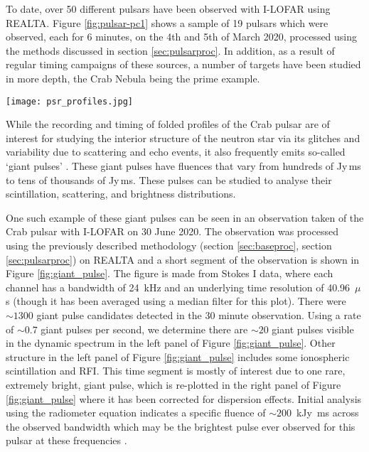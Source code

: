 To date, over 50 different pulsars have been observed with I-LOFAR using REALTA. Figure \ref{fig:pulsar-pc1} shows a sample of 19 pulsars which were observed, each for 6 minutes, on the 4th and 5th of March 2020, processed using the methods discussed in section \ref{sec:pulsarproc}. In addition, as a result of regular timing campaigns of these sources, a number of targets have been studied in more depth, the Crab Nebula being the prime example. 
\begin{figure*}[t]
    \centering
    \texttt{[image: psr\_profiles.jpg]}
    \caption[Sample of 19 pulsars observed with I-LOFAR and REALqTA.]{Sample of 19 pulsars observed with I-LOFAR and REALTA. Each of these observations is 6 minutes in duration and were taken on 4--5 March 2020 using the HBA antennas (\SIrange{110}{190}{\mega \hertz}). The data were processed using the method described in section \ref{sec:pulsarproc} and plotted using \texttt{PSRCHIVE}. The x-axis in each plot is the pulse phase in radians, while the y-axis is flux density in arbitrary units.}
    \label{fig:pulsar-pc1}
\end{figure*}
While the recording and timing of folded profiles of the Crab pulsar are of interest for studying the interior structure of the neutron star via its glitches \citep{Lyne2015} and variability due to scattering and echo events, it also frequently emits so-called `giant pulses' \citep{Meyers2017}. These giant pulses have fluences that vary from hundreds of Jy\,ms to tens of thousands of Jy\,ms. These pulses can be studied to analyse their scintillation, scattering, and brightness distributions.

One such example of these giant pulses can be seen in an observation taken of the Crab pulsar with I-LOFAR on 30 June 2020. The observation was processed using the previously described methodology (section \ref{sec:baseproc}, section \ref{sec:pulsarproc}) on REALTA and a short segment of the observation is shown in Figure \ref{fig:giant_pulse}. The figure is made from Stokes I data, where each channel has a bandwidth of 24~kHz and an underlying time resolution of 40.96~$\mu$s (though it has been averaged using a median filter for this plot). There were $\sim 1300$ giant pulse candidates detected in the 30 minute observation. Using a rate of $\sim 0.7$ giant pulses per second, we determine there are $\sim 20$ giant pulses visible in the dynamic spectrum in the left panel of Figure \ref{fig:giant_pulse}. Other structure in the left panel of Figure \ref{fig:giant_pulse} includes some ionospheric scintillation and RFI. This time segment is mostly of interest due to one rare, extremely bright, giant pulse, which is re-plotted in the right panel of Figure \ref{fig:giant_pulse} where it has been corrected for dispersion effects. Initial analysis using the radiometer equation indicates a specific fluence of $\sim 200$~kJy~ms across the observed bandwidth which may be the brightest pulse ever observed for this pulsar at these frequencies \citep{Karuppusamy2012,Meyers2017,VanLeeuwen2020}.

